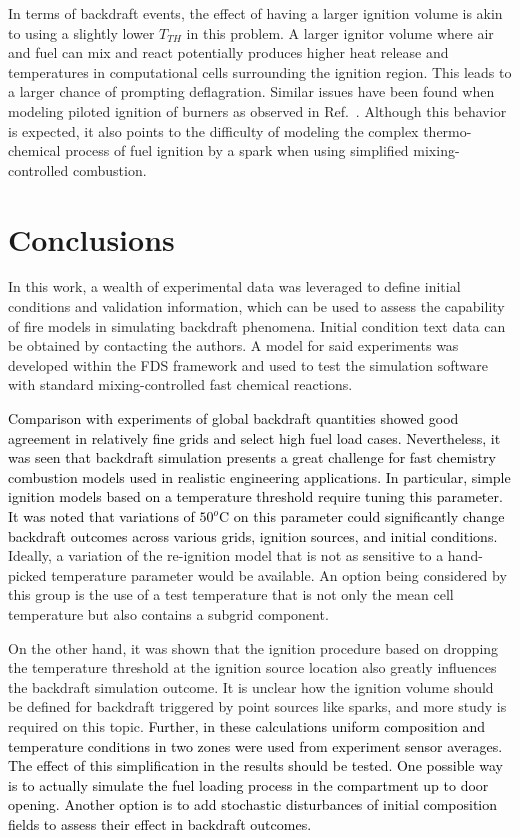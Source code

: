 \documentclass[12pt,letterpaper]{article}
\begin{document}
\begin{flushleft}
In terms of backdraft events, the effect of having a larger ignition volume is akin to using a slightly lower $T_{TH}$ in this problem. A larger ignitor volume where air and fuel can mix and react potentially produces higher heat release and temperatures in computational cells surrounding the ignition region. This leads to a larger chance of prompting deflagration. Similar issues have been found when modeling piloted ignition of burners as observed in Ref.~\cite{White:2017}. Although this behavior is expected, it also points to the difficulty of modeling the complex thermo-chemical process of fuel ignition by a spark when using simplified mixing-controlled combustion.

\section{Conclusions}
\label{sec:concl}

In this work, a wealth of experimental data was leveraged to define initial conditions and validation information, which can be used to assess the capability of fire models in simulating backdraft phenomena. Initial condition text data can be obtained by contacting the authors. A model for said experiments was developed within the FDS framework and used to test the simulation software with standard mixing-controlled fast chemical reactions.

\textcolor{black}{Comparison with experiments of global backdraft quantities showed good agreement in relatively fine grids and select high fuel load cases. Nevertheless, it was seen that backdraft simulation presents a great challenge for fast chemistry combustion models used in realistic engineering applications. In particular, simple ignition models based on a temperature threshold require tuning this parameter. It was noted that variations of $50^o$C on this parameter could significantly change backdraft outcomes across various grids, ignition sources, and initial conditions.} Ideally, a variation of the re-ignition model that is not as sensitive to a hand-picked temperature parameter would be available. An option being considered by this group is the use of a test temperature that is not only the mean cell temperature but also contains a subgrid component. 

On the other hand, it was shown that the ignition procedure based on dropping the temperature threshold at the ignition source location also greatly influences the backdraft simulation outcome. It is unclear how the ignition volume should be defined for backdraft triggered by point sources like sparks, and more study is required on this topic. \textcolor{black}{Further, in these calculations uniform composition and temperature conditions in two zones were used from experiment sensor averages. The effect of this simplification in the results should be tested. One possible way is to actually simulate the fuel loading process in the compartment up to door opening. Another option is to add stochastic disturbances of initial composition fields to assess their effect in backdraft outcomes.} 


\end{flushleft}
\end{document}
